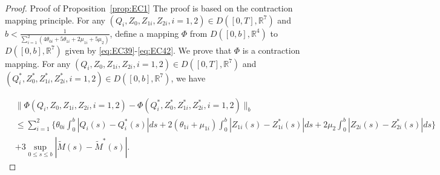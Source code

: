\begin{proof}{Proof of Proposition~\ref{prop:EC1}}
The proof is based on the contraction mapping principle.
For any $(Q_i, Z_0, Z_{1i}, Z_{2i},i=1,2) \in D([0, T], \mathbb{R}^7)$ and $b < \frac{1}{\sum_{i=1}^{2}(4\theta_{0i} + 5\theta_{1i} + 2\mu_{1i} + 5\mu_2)}$, define a mapping $\Phi$ from $D([0, b], \mathbb{R}^4)$ to $D([0, b], \mathbb{R}^7)$ given by \eqref{eq:EC39}-\eqref{eq:EC42}.
We prove that $\Phi$ is a contraction mapping.
For any $(Q_i, Z_0, Z_{1i}, Z_{2i},i=1,2) \in D([0, T], \mathbb{R}^7)$ and $(Q_i^*, Z^*_0, Z^*_{1i}, Z^*_{2i},i=1,2) \in D([0, b], \mathbb{R}^7)$, we have

\begin{align}
& \| \Phi(Q_i, Z_0, Z_{1i}, Z_{2i},i=1,2) - \Phi(Q_i^*, Z^*_0, Z^*_{1i}, Z^*_{2i},i=1,2) \|_b \nonumber\\
& \le \sum_{i=1}^{2}\{\theta_{0i} \int_0^b |Q_i(s) - Q_i^*(s)|ds + 2(\theta_{1i} + \mu_{1i}) \int_0^b |Z_{1i}(s) - Z^*_{1i}(s)|ds + 2\mu_2 \int_0^b |Z_{2i}(s) - Z^*_{2i}(s)|ds\} \nonumber\\
& + 3 \sup_{0 \le s \le b} |\tilde{M}(s) - \tilde{M}^*(s)|. \label{eq:EC16}
\end{align}


\end{proof}
